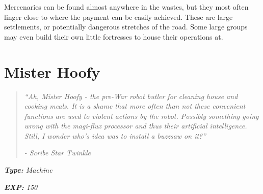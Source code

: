 \documentclass[11pt,a4paper,twocolumn]{book}
\begin{document}
	Mercenaries can be found almost anywhere in the wastes, but they most often linger close to where the payment can be easily achieved. These are large settlements, or potentially dangerous stretches of the road. Some large groups may even build their own little fortresses to house their operations at.
	
	\clearpage
	
	\section*{Mister Hoofy}
	\begin{quote}
		\emph{``Ah, Mister Hoofy - the pre-War robot butler for cleaning house and cooking meals. It is a shame that more often than not these convenient functions are used to violent actions by the robot. Possibly something going wrong with the magi-flux processor and thus their artificial intelligence. Still, I wonder who's idea was to install a buzzsaw on it?''}
		
		\emph{-	Scribe Star Twinkle}
	\end{quote}

	\noindent
	\emph{\textbf{Type:} Machine}
	
	\noindent	
	\emph{\textbf{EXP:} 150}
	
%		
%	
%		
	
\end{document}
